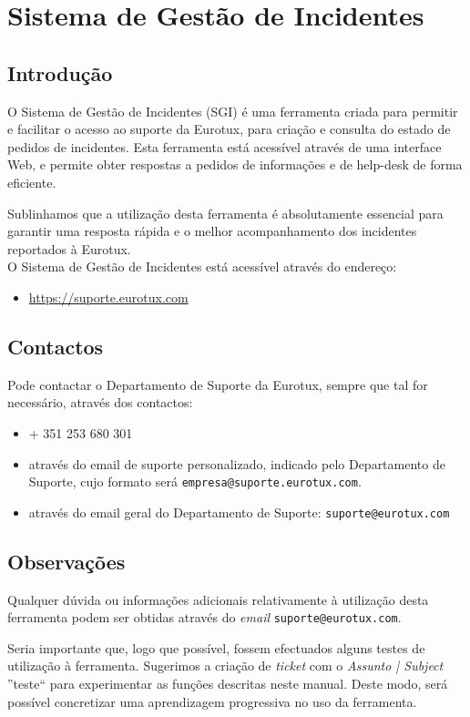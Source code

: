 \def\directorynameimg{./include/img}
\chapter{Sistema de Gestão de Incidentes}
\section{Introdução}
O Sistema de Gestão de Incidentes (SGI) é uma ferramenta criada para permitir e facilitar o acesso ao suporte da Eurotux, para criação e consulta do estado de pedidos de incidentes. Esta ferramenta está acessível através de uma interface Web, e permite obter respostas a pedidos de informações e de help-desk de forma eficiente.

Sublinhamos que a utilização desta ferramenta é absolutamente essencial para garantir uma resposta rápida e o melhor acompanhamento dos incidentes reportados à Eurotux. \\

O Sistema de Gestão de Incidentes está acessível através do endereço:
\begin{itemize}
\item \url{https://suporte.eurotux.com}
\end{itemize}

\section{Contactos}\label{sgi:contactos}
Pode contactar o Departamento de Suporte da Eurotux, sempre que tal for necessário, através dos contactos:
\begin{itemize}
\item + 351 253 680 301
\item através do email de suporte personalizado, indicado pelo Departamento de Suporte, cujo formato será \texttt{empresa@suporte.eurotux.com}.
\item através do email geral do Departamento de Suporte: \texttt{suporte@eurotux.com}
\end{itemize}

\section{Observações}
Qualquer dúvida ou informações adicionais relativamente à utilização desta ferramenta podem ser obtidas através do \emph{email} \texttt{suporte@eurotux.com}.

Seria importante que, logo que possível, fossem efectuados alguns testes de utilização à ferramenta. Sugerimos a criação de \emph{ticket} com o \emph{Assunto | Subject} ''teste`` para experimentar as funções descritas neste manual. Deste modo, será possível concretizar uma aprendizagem progressiva no uso da ferramenta.

